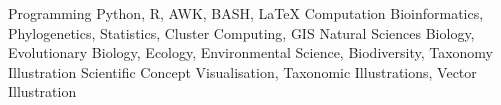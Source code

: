 

\begin{cvskills}

  \cvskill
    {Programming} %
    {Python, R, AWK, BASH, LaTeX} %
  \cvskill
    {Computation} %
    {Bioinformatics, Phylogenetics, Statistics, Cluster Computing, GIS} %
  \cvskill
    {Natural Sciences} %
    {Biology, Evolutionary Biology, Ecology, Environmental Science, Biodiversity, Taxonomy} %
  \cvskill
    {Illustration} %
    {Scientific Concept Visualisation, Taxonomic Illustrations, Vector Illustration} %
\end{cvskills}
